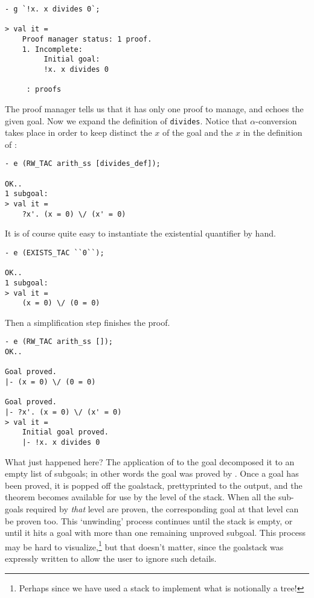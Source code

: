 \begin{session}
\begin{verbatim}
- g `!x. x divides 0`;

> val it =
    Proof manager status: 1 proof.
    1. Incomplete:
         Initial goal:
         !x. x divides 0

     : proofs
\end{verbatim}
\end{session}
The proof manager tells us that it has only one proof to manage, and
echoes the given goal.  Now we expand the definition of
\verb+divides+. Notice that $\alpha$-conversion takes place in order to
keep distinct the $x$ of the goal and the $x$ in the definition of
:
\begin{session}
\begin{verbatim}
- e (RW_TAC arith_ss [divides_def]);

OK..
1 subgoal:
> val it =
    ?x'. (x = 0) \/ (x' = 0)
\end{verbatim}
\end{session}
It is of course quite easy to instantiate the existential quantifier by
hand.
\begin{session}
\begin{verbatim}
- e (EXISTS_TAC ``0``);

OK..
1 subgoal:
> val it =
    (x = 0) \/ (0 = 0)
\end{verbatim}
\end{session}
Then a simplification step finishes the proof.
\begin{session}
\begin{verbatim}
- e (RW_TAC arith_ss []);
OK..

Goal proved.
|- (x = 0) \/ (0 = 0)

Goal proved.
|- ?x'. (x = 0) \/ (x' = 0)
> val it =
    Initial goal proved.
    |- !x. x divides 0
\end{verbatim}
\end{session}

What just happened here? The application of  to the goal
decomposed it to an empty list of subgoals; in other words the goal was
proved by .  Once a goal has been proved, it is popped off
the goalstack, prettyprinted to the output, and the theorem becomes
available for use by the level of the stack. When all the sub-goals
required by \textit{that} level are proven, the corresponding goal at
that level can be proven too.  This `unwinding' process continues until
the stack is empty, or until it hits a goal with more than one remaining
unproved subgoal. This process may be hard to
visualize,\footnote{Perhaps since we have used a stack to implement what
is notionally a tree!} but that doesn't matter, since the goalstack was
expressly written to allow the user to ignore such details.

